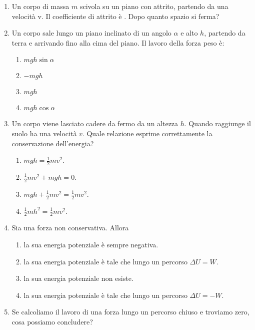 \documentclass{article}
\begin{document}
\begin{enumerate}
  \item Un corpo di massa $m$ scivola su un piano con attrito, partendo da una velocità v. Il coefficiente di attrito è \mu. Dopo quanto spazio si ferma?
  \begin{enumerate}[label=\Alph*.]
    \item $\frac{2v^2}{g\mu}}$.
    \item $\frac{v^2}{2g\mu}}$.
    \item $\frac{1}{2}v^2-\mu g$.
    \item $\frac{1}{2}v^2+\mu g$.
  \end{enumerate}
  \item Un corpo sale lungo un piano inclinato di un angolo $\alpha$ e alto $h$, partendo da terra e arrivando fino alla cima del piano. Il lavoro della forza peso è:
  \begin{enumerate}[label=\Alph*.]
    \item $mgh\sin\alpha$
    \item $-mgh$
    \item $mgh$
    \item $mgh\cos\alpha$
  \end{enumerate}
  \item Un corpo viene lasciato cadere da fermo da un altezza $h$. Quando raggiunge il suolo ha una velocità $v$. Quale relazione esprime correttamente la conservazione dell'energia?
  \begin{enumerate}[label=\Alph*.]
    \item $mgh=\frac{1}{2}mv^2$.
    \item $\frac{1}{2}mv^2+mgh=0.$
    \item $mgh+\frac{1}{2}mv^2=\frac{1}{2}mv^2.$
    \item $\frac{1}{2}mh^2=\frac{1}{2}mv^2$.
  \end{enumerate}
  \item Sia  una forza non conservativa. Allora
  \begin{enumerate}[label=\Alph*.]
    \item la sua energia potenziale è sempre negativa.
    \item la sua energia potenziale è tale che lungo un percorso $\Delta U=W$.
    \item la sua energia potenziale non esiste.
    \item la sua energia potenziale è tale che lungo un percorso $\Delta U=-W$.
  \end{enumerate}
  \item Se calcoliamo il lavoro di una forza lungo un percorso chiuso e troviamo zero, cosa possiamo concludere?

\end{enumerate}
\end{document}
